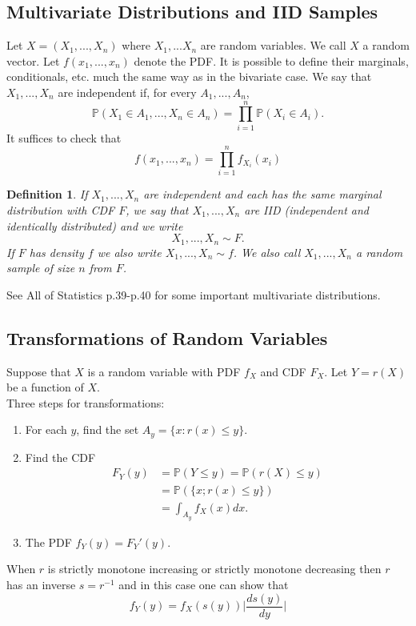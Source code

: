 \documentclass{article}
\newtheorem{definition}[counter]{Definition}
\theoremstyle{remark}
\newcommand{\1}{\mathbf{1}}
\newcommand{\Prob}{\mathbb{P}}
\begin{document}
\subsection{Multivariate Distributions and IID Samples}
Let $X = (X_1,...,X_n)$ where $X_1,...X_n$ are random variables. We call $X$ a random vector. Let $f(x_1,...,x_n)$ denote the PDF. It is possible to define their marginals, conditionals, etc. much the same way as in the bivariate case. We say that $X_1,...,X_n$ are independent if, for every $A_1,...,A_n$,
\[
\Prob(X_1 \in A_1,...,X_n \in A_n) = \prod_{i=1}^{n}\Prob(X_i \in A_i).
\]
It suffices to check that 
\[
f(x_1,...,x_n) = \prod_{i=1}^{n} f_{X_i}(x_i)
\]

\begin{definition}
	If $X_1,...,X_n$ are independent and each has the same marginal distribution with CDF $F$, we say that $X_1,...,X_n$ are IID (independent and identically distributed) and we write
	\[
	X_1,...,X_n \sim F.
	\]
	If $F$ has density $f$ we also write $X_1,...,X_n \sim f$. We also call $X_1,...,X_n$ a random sample of size $n$ from $F$.
\end{definition}
\noindent See All of Statistics p.39-p.40 for some important multivariate distributions.

\subsection{Transformations of Random Variables}
Suppose that $X$ is a random variable with PDF $f_X$ and CDF $F_X$. Let $Y=r(X)$ be a function of $X$. \\

\noindent Three steps for transformations:
\begin{enumerate}
	\item For each $y$, find the set $A_y = \{x: r(x) \leq y\}$.
	\item Find the CDF 
	\[
	\begin{split}
	F_Y(y) 	&= \Prob(Y \leq y) = \Prob(r(X) \leq y) \\
			&= \Prob(\{x; r(x) \leq y\}) \\
			&= \int_{A_y} f_X(x)dx.
	\end{split}
	\]
	\item The PDF $f_Y(y) = F_Y'(y)$. 
\end{enumerate}
When $r$ is strictly monotone increasing or strictly monotone decreasing then $r$ has an inverse $s = r^{-1}$ and in this case one can show that
\[
f_Y(y) = f_X(s(y))\Bigg|\frac{ds(y)}{dy}\Bigg|
\]
\end{document}
